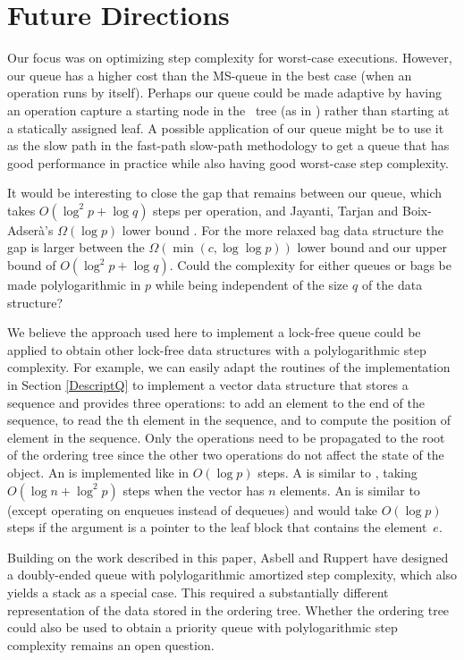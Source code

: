 
\section{Future Directions}

Our focus was on optimizing step complexity for worst-case executions.
However, our queue has a higher cost than the MS-queue in the best case (when an operation
runs by itself).
Perhaps our queue could be made adaptive by having an operation capture a starting node
in the \ordering\ tree (as in \cite{DBLP:conf/stoc/AfekDT95}) rather than starting at a statically assigned leaf.
A possible application of our queue  might be to use it as the slow path in the
fast-path slow-path methodology  \cite{10.1145/2370036.2145835} to
get a queue that has good performance in practice while also having good worst-case step complexity.

It would be interesting to close the gap that remains between our queue, which takes $O(\log^2 p + \log q)$ steps per operation,
and Jayanti, Tarjan and Boix-Adser\`{a}'s $\Omega(\log p)$ lower bound \cite{JTB19}.
For the more relaxed bag data structure the gap is larger between the  $\Omega(\min(c,\log\log p))$ lower bound \cite{DBLP:conf/opodis/AttiyaF17} and our upper bound of $O(\log^2 p + \log q)$.
Could the complexity for either queues or bags be made polylogarithmic in $p$ while being independent of the size $q$ of the data structure?

We believe the approach used here to implement a lock-free queue 
could be applied to obtain other lock-free
data structures with a polylogarithmic step complexity.
For example, we can easily adapt the routines of the implementation in Section \ref{DescriptQ} 
to implement a  vector data structure that stores a sequence and
provides three operations:  to add an element  to the end of the sequence,
 to read the th element in the sequence, and
 to compute the position of element  in the sequence.
Only the  operations need to be propagated to the root of the ordering tree
since the other two operations do not affect the state of the object.
An  is implemented like  in $O(\log p)$ steps.  
A  is similar to , taking $O(\log n + \log^2p)$ steps when the vector has $n$ elements.  
An  is similar to  (except operating on enqueues instead of dequeues) and would take $O(\log p)$ steps if the argument is a pointer to the leaf block that contains the element~$e$.

Building on the work described in this paper, Asbell and Ruppert \cite{AR23} have
designed a doubly-ended queue with polylogarithmic amortized step
complexity, which also yields a stack as a special case.  
This required a substantially different representation of the data stored in the ordering tree.
Whether the ordering tree could also be used to obtain a priority queue with polylogarithmic step complexity
remains an open question.

